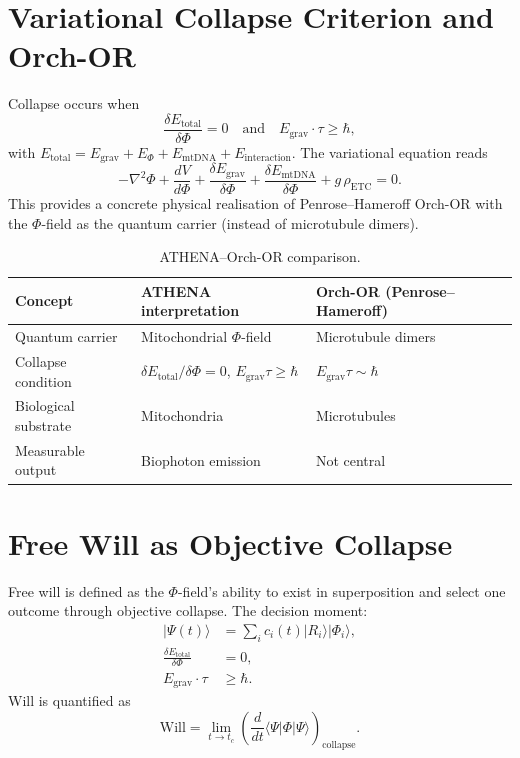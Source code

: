 \documentclass[11pt]{article}
\newcommand{\mtDNA}{\mathrm{mtDNA}}
\begin{document}
\section{Variational Collapse Criterion and Orch-OR}
\label{sec:collapse}
Collapse occurs when
\begin{equation}
\frac{\delta E_{\mathrm{total}}}{\delta\Phi} = 0 \quad\text{and}\quad E_{\mathrm{grav}}\cdot\tau \geq \hbar,
\label{eq:collapse_conditions}
\end{equation}
with $E_{\mathrm{total}} = E_{\mathrm{grav}} + E_{\Phi} + E_{\mtDNA} + E_{\mathrm{interaction}}$. The variational equation reads
\begin{equation}
-\nabla^2\Phi + \frac{dV}{d\Phi} + \frac{\delta E_{\mathrm{grav}}}{\delta\Phi} + \frac{\delta E_{\mtDNA}}{\delta\Phi} + g\,\rho_{\mathrm{ETC}} = 0.
\label{eq:variational}
\end{equation}
This provides a concrete physical realisation of Penrose–Hameroff Orch-OR with the $\Phi$-field as the quantum carrier (instead of microtubule dimers).

\begin{table}[ht]
\centering
\caption{ATHENA–Orch-OR comparison.}
\label{tab:orchor}
\begin{tabular}{lll}
\toprule
Concept & ATHENA interpretation & Orch-OR (Penrose–Hameroff) \\
\midrule
Quantum carrier & Mitochondrial $\Phi$-field & Microtubule dimers \\
Collapse condition & $\delta E_{\mathrm{total}}/\delta\Phi=0$, $E_{\mathrm{grav}}\tau\ge\hbar$ & $E_{\mathrm{grav}}\tau\sim\hbar$ \\
Biological substrate & Mitochondria & Microtubules \\
Measurable output & Biophoton emission & Not central \\
\bottomrule
\end{tabular}
\end{table}

\section{Free Will as Objective Collapse}
\label{sec:freewill}
Free will is defined as the $\Phi$-field’s ability to exist in superposition and select one outcome through objective collapse. The decision moment:
\begin{align}
|\Psi(t)\rangle &= \sum_i c_i(t) |R_i\rangle|\Phi_i\rangle, \label{eq:freewill1}\\
\frac{\delta E_{\mathrm{total}}}{\delta\Phi} &= 0, \label{eq:freewill2}\\
E_{\mathrm{grav}}\cdot\tau &\geq \hbar. \label{eq:freewill3}
\end{align}
Will is quantified as
\begin{equation}
\text{Will} = \lim_{t\to t_c} \left( \frac{d}{dt} \langle \Psi | \Phi | \Psi \rangle \right)_{\mathrm{collapse}}.
\label{eq:will}
\end{equation}
\end{document}
